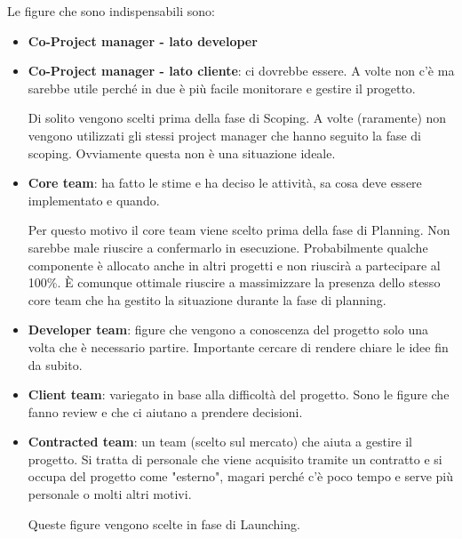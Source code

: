 Le figure che sono indispensabili sono:
\begin{itemize}
	\item \textbf{Co-Project manager - lato developer}
	\item \textbf{Co-Project manager - lato cliente}: ci dovrebbe essere. A volte non c'è ma sarebbe utile perché in due è più facile monitorare e gestire il progetto.
	\begin{info}
		Di solito vengono scelti prima della fase di Scoping. A volte (raramente) non vengono utilizzati gli stessi project manager che hanno seguito la fase di scoping. Ovviamente questa non è una situazione ideale.
	\end{info}
	\item \textbf{Core team}: ha fatto le stime e ha deciso le attività, sa cosa deve essere implementato e quando.
	\begin{info}
		Per questo motivo il core team viene scelto prima della fase di Planning. Non sarebbe male riuscire a confermarlo in esecuzione. Probabilmente qualche componente è allocato anche in altri progetti e non riuscirà a partecipare al 100\%. È comunque ottimale riuscire a massimizzare la presenza dello stesso core team che ha gestito la situazione durante la fase di planning.
	\end{info}
	\item \textbf{Developer team}: figure che vengono a conoscenza del progetto solo una volta che è necessario partire. Importante cercare di rendere chiare le idee fin da subito.
	\item \textbf{Client team}: variegato in base alla difficoltà del progetto. Sono le figure che fanno review e che ci aiutano a prendere decisioni.
	\item \textbf{Contracted team}: un team (scelto sul mercato) che aiuta a gestire il progetto. Si tratta di personale che viene acquisito tramite un contratto e si occupa del progetto come "esterno", magari perché c'è poco tempo e serve più personale o molti altri motivi.
	\begin{info}
		Queste figure vengono scelte in fase di Launching.
	\end{info}
\end{itemize}

